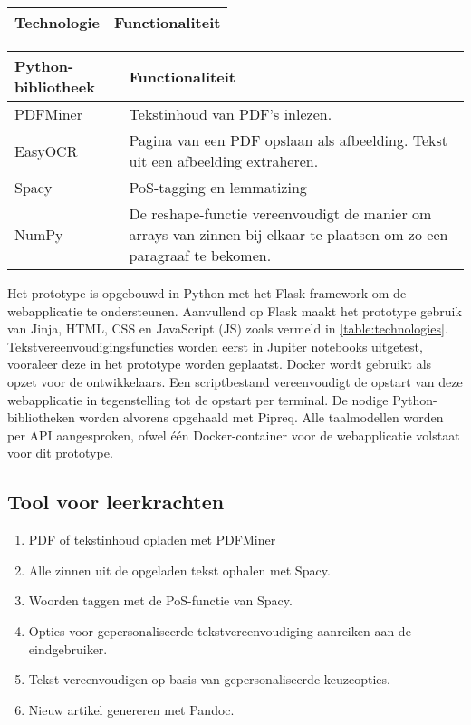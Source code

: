 \begin{center}
	\begin{tabular}{ | m{4cm} | m{12cm} | } 
		\hline
		\textbf{Technologie} & \textbf{Functionaliteit} \\
		\hline
		
		\hline
	\end{tabular}
	\label{table:technologies}
\end{center}


\begin{center}
	\begin{tabular}{ | m{4cm} | m{12cm} | } 
		\hline
		\textbf{Python-bibliotheek} & \textbf{Functionaliteit} \\
		\hline
		PDFMiner & Tekstinhoud van PDF's inlezen. \\ 
		EasyOCR	& Pagina van een PDF opslaan als afbeelding. Tekst uit een afbeelding extraheren. \\
		Spacy & PoS-tagging en lemmatizing \\
		NumPy & De reshape-functie vereenvoudigt de manier om arrays van zinnen bij elkaar te plaatsen om zo een paragraaf te bekomen. \\
		\hline
	\end{tabular}
	\label{table:python-libraries}
\end{center}

Het prototype is opgebouwd in Python met het Flask-framework om de webapplicatie te ondersteunen. Aanvullend op Flask maakt het prototype gebruik van Jinja, HTML, CSS en JavaScript (JS) zoals vermeld in \ref{table:technologies}. Tekstvereenvoudigingsfuncties worden eerst in Jupiter notebooks uitgetest, vooraleer deze in het prototype worden geplaatst. Docker wordt gebruikt als opzet voor de ontwikkelaars. Een scriptbestand vereenvoudigt de opstart van deze webapplicatie in tegenstelling tot de opstart per terminal. De nodige Python-bibliotheken worden alvorens opgehaald met Pipreq. Alle taalmodellen worden per API aangesproken, ofwel één Docker-container voor de webapplicatie volstaat voor dit prototype.

\subsection{Tool voor leerkrachten}

\begin{enumerate}
	\item PDF of tekstinhoud opladen met PDFMiner
	\item Alle zinnen uit de opgeladen tekst ophalen met Spacy.
	\item Woorden taggen met de PoS-functie van Spacy.
	\item Opties voor gepersonaliseerde tekstvereenvoudiging aanreiken aan de eindgebruiker.
	\item Tekst vereenvoudigen op basis van gepersonaliseerde keuzeopties.
	\item Nieuw artikel genereren met Pandoc.
\end{enumerate}

